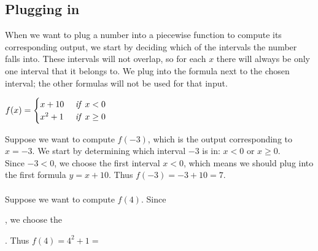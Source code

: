\documentclass{ximera}
\begin{document}
\subsection*{Plugging in}
When we want to plug a number into a piecewise function to compute its corresponding output, we start by deciding which of the intervals the number falls into. These intervals will not overlap, so for each $x$ there will always be only one interval that it belongs to. We plug into the formula next to the chosen interval; the other formulas will not be used for that input.

\begin{example}
$f(x)=\begin{cases} x+10 & \mbox{ \emph{if} }x<0\\x^2+1 & \mbox{ \emph{if} } x\geq 0\end{cases}$

Suppose we want to compute $f(-3)$, which is the output corresponding to $x=-3$. We start by determining which interval $-3$ is in: $x<0$ or $x\geq 0$. \\Since $-3<0$, we choose the first interval $x<0$, which means we should plug into the first formula $y=x+10$. Thus $f(-3)=-3+10=7$.
\\
\\Suppose we want to compute $f(4)$. Since 
\begin{multipleChoice}
  \end{multipleChoice}
, we choose the 
\begin{multipleChoice}
  \end{multipleChoice}. Thus $f(4)=4^2+1=$
  \begin{multipleChoice}
  \end{multipleChoice}
\end{example}
\end{document}
